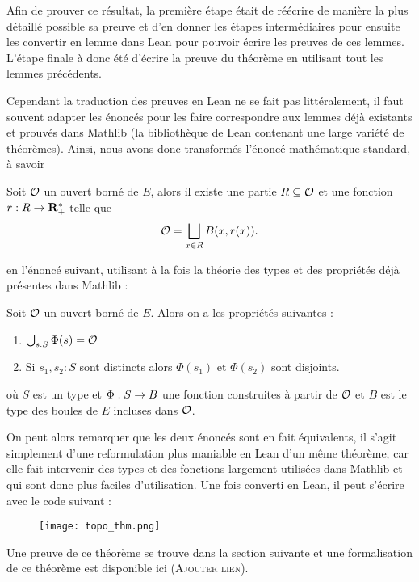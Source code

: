 \documentclass[../../rapport.tex]{subfiles}
\begin{document}
  Afin de prouver ce résultat, la première étape était de réécrire de manière la plus détaillé possible sa preuve et d'en donner
  les étapes intermédiaires pour ensuite les convertir en lemme dans Lean pour pouvoir écrire les preuves de ces lemmes.
  L'étape finale à donc été d'écrire la preuve du théorème en utilisant tout les lemmes précédents.

  Cependant la traduction des preuves en Lean ne se fait pas littéralement, il faut souvent adapter les énoncés pour
  les faire correspondre aux lemmes déjà existants et prouvés dans Mathlib (la bibliothèque de Lean contenant une large variété de théorèmes).
  Ainsi, nous avons donc transformés l'énoncé mathématique standard, à savoir
  \begin{theorem*}
    Soit $\mathcal{O}$ un ouvert borné de $E$, alors il existe une partie $R \subseteq \mathcal{O}$ et une fonction $r : R \rightarrow \mathbf R^*_+$ telle que
    $$\mathcal{O} = \bigsqcup_{x \in R}{B(x, r(x))}.$$
  \end{theorem*}
  en l'énoncé suivant, utilisant à la fois la théorie des types et des propriétés déjà présentes dans Mathlib :

  \begin{theorem*}
    Soit $\mathcal{O}$ un ouvert borné de $E$. Alors on a les propriétés suivantes :
    \begin{enumerate}
      \item $\bigcup_{s : S}{\Phi(s)} = \mathcal{O}$
      \item Si $s_1, s_2 : S$ sont distincts alors $\Phi(s_1)$ et $\Phi(s_2)$ sont disjoints.
    \end{enumerate}
    où $S$ est un type et $\Phi : S \rightarrow B$ une fonction construites à partir de $\mathcal{O}$ et $B$ est le type des boules de $E$ incluses dans $\mathcal{O}$.
  \end{theorem*}

  On peut alors remarquer que les deux énoncés sont en fait équivalents, il s'agit simplement d'une reformulation
  plus maniable en Lean d'un même théorème, car elle fait intervenir des types et des fonctions largement utilisées dans Mathlib
  et qui sont donc plus faciles d'utilisation. Une fois converti en Lean, il peut s'écrire avec le code suivant :

  \begin{figure}[ht]
    \centering
    \texttt{[image: topo\_thm.png]}
  \end{figure}

  Une preuve de ce théorème se trouve dans la section suivante et une formalisation de ce théorème est disponible ici (\textsc{Ajouter lien}).
\end{document}
